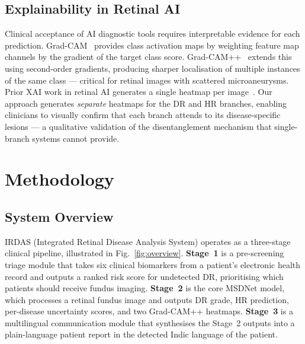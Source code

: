 \documentclass[review,12pt]{elsarticle}
\begin{document}
\subsection{Explainability in Retinal AI}

Clinical acceptance of AI diagnostic tools requires interpretable evidence for
each prediction. Grad-CAM~\cite{selvaraju2017} provides class activation maps
by weighting feature map channels by the gradient of the target class score.
Grad-CAM++~\cite{chattopadhyay2018} extends this using second-order gradients,
producing sharper localisation of multiple instances of the same class —
critical for retinal images with scattered microaneurysms. Prior XAI work in
retinal AI generates a single heatmap per image~\cite{sayres2019}. Our
approach generates \textit{separate} heatmaps for the DR and HR branches,
enabling clinicians to visually confirm that each branch attends to its
disease-specific lesions — a qualitative validation of the disentanglement
mechanism that single-branch systems cannot provide.

\section{Methodology}
\label{sec:method}

\subsection{System Overview}

IRDAS (Integrated Retinal Disease Analysis System) operates as a three-stage
clinical pipeline, illustrated in Fig.~\ref{fig:overview}. \textbf{Stage~1}
is a pre-screening triage module that takes six clinical biomarkers from a
patient's electronic health record and outputs a ranked risk score for
undetected DR, prioritising which patients should receive fundus imaging.
\textbf{Stage~2} is the core MSDNet model, which processes a retinal fundus
image and outputs DR grade, HR prediction, per-disease uncertainty scores,
and two Grad-CAM++ heatmaps. \textbf{Stage~3} is a multilingual communication
module that synthesises the Stage~2 outputs into a plain-language patient
report in the detected Indic language of the patient.
\end{document}
